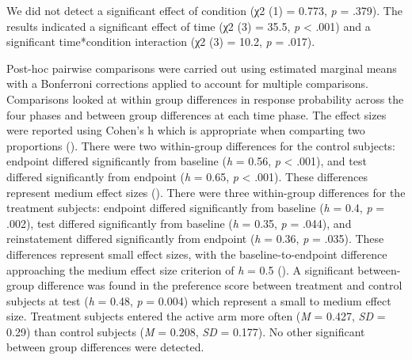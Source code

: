 \documentclass[
  jou,
  floatsintext,
  longtable,
  nolmodern,
  notxfonts,
  notimes,
  donotrepeattitle,
  colorlinks=true,linkcolor=blue,citecolor=blue,urlcolor=blue]{apa7}
\begin{document}
We did not detect a significant effect of condition (χ2 (1) = 0.773,
\emph{p} = .379). The results indicated a significant effect of time (χ2
(3) = 35.5, \emph{p} \textless{} .001) and a significant time*condition
interaction (χ2 (3) = 10.2, \emph{p} = .017).

Post-hoc pairwise comparisons were carried out using estimated marginal
means with a Bonferroni corrections applied to account for multiple
comparisons. Comparisons looked at within group differences in response
probability across the four phases and between group differences at each
time phase. The effect sizes were reported using Cohen's h which is
appropriate when comparting two proportions
(). There were two
within-group differences for the control subjects: endpoint differed
significantly from baseline (\emph{h} = 0.56, \emph{p} \textless{}
.001), and test differed significantly from endpoint (\emph{h} = 0.65,
\emph{p} \textless{} .001). These differences represent medium effect
sizes (). There were three within-group differences for the treatment
subjects: endpoint differed significantly from baseline (\emph{h} = 0.4,
\emph{p} = .002), test differed significantly from baseline (\emph{h} =
0.35, \emph{p} = .044), and reinstatement differed significantly from
endpoint (\emph{h} = 0.36, \emph{p} = .035). These differences represent
small effect sizes, with the baseline-to-endpoint difference approaching
the medium effect size criterion of \emph{h} = 0.5
(). A
significant between-group difference was found in the preference score
between treatment and control subjects at test (\emph{h} = 0.48,
\emph{p} = 0.004) which represent a small to medium effect size.
Treatment subjects entered the active arm more often (\emph{M} = 0.427,
\emph{SD} = 0.29) than control subjects (\emph{M} = 0.208, \emph{SD} =
0.177). No other significant between group differences were detected.

\newpage
\end{document}
